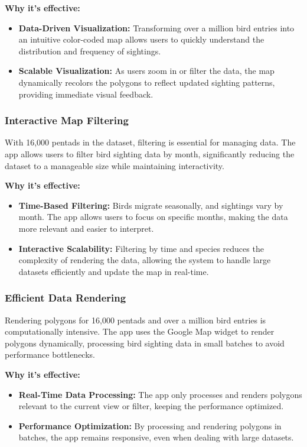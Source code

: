 \documentclass{article}
\begin{document}
\textbf{Why it's effective:}
\begin{itemize}
    \item \textbf{Data-Driven Visualization:} Transforming over a million bird entries into an intuitive color-coded map allows users to quickly understand the distribution and frequency of sightings.
    \item \textbf{Scalable Visualization:} As users zoom in or filter the data, the map dynamically recolors the polygons to reflect updated sighting patterns, providing immediate visual feedback.
\end{itemize}

\subsubsection{Interactive Map Filtering}
With 16,000 pentads in the dataset, filtering is essential for managing data. The app allows users to filter bird sighting data by month, significantly reducing the dataset to a manageable size while maintaining interactivity.

\textbf{Why it's effective:}
\begin{itemize}
    \item \textbf{Time-Based Filtering:} Birds migrate seasonally, and sightings vary by month. The app allows users to focus on specific months, making the data more relevant and easier to interpret.
    \item \textbf{Interactive Scalability:} Filtering by time and species reduces the complexity of rendering the data, allowing the system to handle large datasets efficiently and update the map in real-time.
\end{itemize}

\subsubsection{Efficient Data Rendering}
Rendering polygons for 16,000 pentads and over a million bird entries is computationally intensive. The app uses the Google Map widget to render polygons dynamically, processing bird sighting data in small batches to avoid performance bottlenecks.

\textbf{Why it's effective:}
\begin{itemize}
    \item \textbf{Real-Time Data Processing:} The app only processes and renders polygons relevant to the current view or filter, keeping the performance optimized.
    \item \textbf{Performance Optimization:} By processing and rendering polygons in batches, the app remains responsive, even when dealing with large datasets.
\end{itemize}
\end{document}
